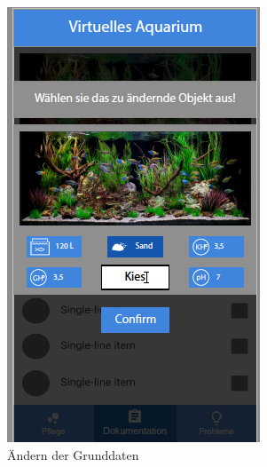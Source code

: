 \begin{figure}
\begin{subfigure}[b]{0.3\textwidth}
		\includegraphics[width=\textwidth]{virtuellesAquariumEdit}
		\caption{Ändern der Grunddaten}\label{doku:aq:b}
	\end{subfigure}	
	\begin{subfigure}[b]{0.3\textwidth}

\end{subfigure}
\end{figure}
